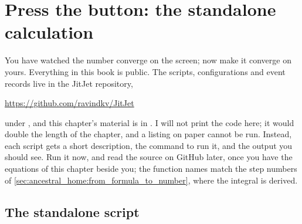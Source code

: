 \section{Press the button: the standalone calculation}
\label{sec:ancestral_home:standalone_code}

You have watched the number converge on the screen; now make it converge on
yours. Everything in this book is public. The scripts, configurations and
event records live in the JitJet repository,
\begin{center}
  \url{https://github.com/ravindkv/JitJet}
\end{center}
under , and this chapter's material is in .
I will not print the code here; it would double the length of the chapter,
and a listing on paper cannot be run. Instead, each script gets a short
description, the command to run it, and the output you should see. Run it
now, and read the source on GitHub later, once you have the equations of
this chapter beside you; the function names match the step numbers of
\cref{sec:ancestral_home:from_formula_to_number}, where the integral is
derived.

\subsection{The standalone script}

